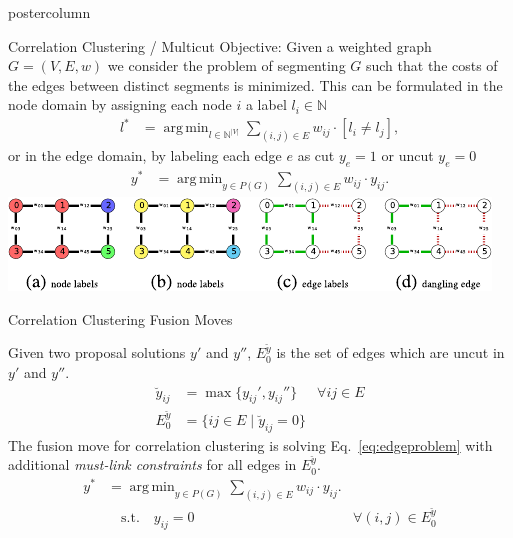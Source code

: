 \documentclass[final,hyperref={pdfpagelabels=false}]{beamer}
\DeclareMathOperator*{\argmin}{arg\,min}
\begin{document}
\begin{frame}
\begin{columns}
\begin{column}{.49\textwidth}
\begin{beamercolorbox}[center,wd=\textwidth]{postercolumn}
\begin{minipage}[T]{.95\textwidth}
{\begin{block}{Correlation Clustering / Multicut Objective:}
            Given a weighted graph $G=(V,E,w)$ we consider the problem of segmenting $G$ such that the costs
            of the edges between distinct segments is minimized. This can be formulated in the node domain
            by assigning each node $i$ a label $l_i \in \mathbb{N}$
            \begin{align}
              l^* &= \argmin_{l \in \mathbb{N}^{|V|}} \sum_{ (i,j) \in E } w_{ij} \cdot [l_{i} \neq l_{j}], \label{eq:nodeproblem}
            \end{align} 
            or in the edge domain, by labeling each edge $e$ as cut $y_e=1$ or uncut $y_e=0$ 
            \begin{align}
              y^* &= \argmin_{y \in P(G)} \sum_{ (i,j) \in E } w_{ij} \cdot y_{ij} \label{eq:edgeproblem}.%
            \end{align}
            \centering
            \includegraphics[width=0.9\linewidth]{ne-crop.pdf}


            \end{block}



            \vfill
            \begin{block}{Correlation Clustering Fusion Moves}

              Given two proposal solutions $y'$ and $y''$,
              $E_0^{\breve{y}}$ is the set of edges
              which are uncut in $y'$ and $y''$.
              \begin{align}
              \breve{y}_{ij}    & = \max\{ y_{ij}', y_{ij}''\}  & \forall {ij}\in E\\  %
              E_0^{\breve{y}}  & =  \{ ij \in E \; | \; \breve{y}_{ij} = 0 \}
              \end{align}
              The fusion move for correlation clustering is solving Eq.~\ref{eq:edgeproblem}
              with additional \emph{must-link constraints} for all edges in $E_0^{\breve{y}}$.
              \begin{align}
                y^* &= \argmin_{y \in P(G)} \sum_{ (i,j) \in E } w_{ij} \cdot y_{ij} \label{eq:fusion_move_a}.\\ 
                    &\quad \textrm{s.t.} \quad y_{ij} = 0 & \forall (i, j) \in E_0^{\breve{y}} \nonumber
              \end{align}
              

\end{block}}
\end{minipage}
\end{beamercolorbox}
\end{column}
\end{columns}
\end{frame}
\end{document}
